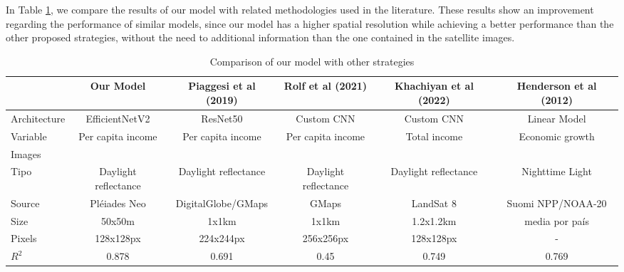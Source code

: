 \documentclass[conference]{IEEEtran}
\begin{document}

In Table \ref{tab:comparación_modelos}, we compare the results of our model with related methodologies used in the literature. These results show an improvement regarding the performance of similar models, since our model has a higher spatial resolution while achieving a better performance than the other proposed strategies, without the need to additional information than the one contained in the satellite images.

\begin{table}[t]
\caption{Comparison of our model with other strategies}  \label{tab:comparación_modelos}
\centering
\begin{tabular}{lccccc}
\hline \hline
 & \multicolumn{1}{c}{Our Model} & \multicolumn{1}{c}{Piaggesi et al (2019)} & 
 \multicolumn{1}{c}{Rolf et al (2021)} & 
\multicolumn{1}{c}{Khachiyan et al (2022)} & 
 \multicolumn{1}{c}{Henderson et al (2012)} \\
\hline
Architecture & \multicolumn{1}{c}{EfficientNetV2} & \multicolumn{1}{c}{ResNet50} & \multicolumn{1}{c}{Custom CNN}  & \multicolumn{1}{c}{Custom CNN} & \multicolumn{1}{c}{Linear Model} \\
Variable & Per capita income & Per capita income & Per capita income  & Total income & Economic growth \\
Images  & & & \\
\;\;\; Tipo & Daylight reflectance & Daylight reflectance & Daylight reflectance & Daylight reflectance & Nighttime Light \\
\;\;\; Source & Pléiades Neo & DigitalGlobe/GMaps & GMaps & LandSat 8 & Suomi NPP/NOAA-20 \\
\;\;\; Size & 50x50m & 1x1km & 1x1km & 1.2x1.2km & media por país \\
\;\;\; Pixels & 128x128px & 224x244px & 256x256px & 128x128px  & - \\
$R^2$ & 0.878 & 0.691 & 0.45 & 0.749  & 0.769 \\
\hline \hline
\end{tabular}
\end{table}

\end{document}
